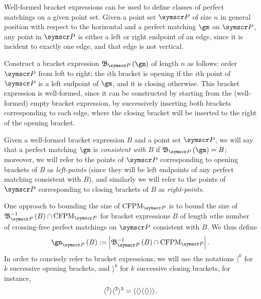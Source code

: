Well-formed bracket expressions can be used to define classes of perfect matchings on a given point set.
Given a point set $\pointset P$  of size $n$ in general position with respect to the horizontal and a perfect
matching $\gm$ on $\pointset P$, any point in $\pointset P$ is either a left or right endpoint of an edge, since it
is incident to exactly one edge, and that edge is not vertical.

Construct a bracket expression $\bracketing_{\pointset P}\of\gm$ of length $n$ as follows: order $\pointset P$ from left
to right;
the $i$th bracket is opening if the $i$th point of $\pointset P$ is a left endpoint of $\gm$, and it is
closing otherwise.
This bracket expression is well-formed, since it can be constructed by starting from the
(well-formed) empty bracket expression, by successively inserting both brackets corresponding to
each edge, where the closing bracket will be inserted to the right of the opening bracket.

Given a well-formed bracket expression $B$ and a point set $\pointset P$, we will say that a perfect matching
$\gm$ is \emph{consistent with} $B$ if $\bracketing_{\pointset P}\of\gm = B$; moreover, we will refer to the points of
$\pointset P$ corresponding to opening brackets of $B$ as \emph{left-points} (since they will be left endpoints
of any perfect matching consistent with $B$), and similarly we will refer to the points of $\pointset P$
corresponding to closing brackets of $B$ as \emph{right-points}.

One approach to bounding the size of $\CFPM_{\pointset P}$ is to bound the size of
$\bracketing_{\pointset P}^{-1}\of{B}\Intersection \CFPM_{\pointset P}$ for bracket expressions $B$ of length $n$\idest the
number of crossing-free perfect matchings on $\pointset P$ consistent with $B$. We thus define
\[\gn_{\pointset P}\of B \DefineAs
\Cardinality{\bracketing_{\pointset P}^{-1}\of{B}\Intersection \CFPM_{\pointset P}}\text.\]
In order to concisely refer to bracket expressions, we will use the notations
$\langle^k$ for $k$ successive opening brackets, and $\rangle^k$ for $k$ successive
closing brackets, for instance,\[
\langle^2\rangle\langle^2\rangle^3 = \langle\langle\rangle\langle\langle\rangle\rangle\rangle
\text.\]

